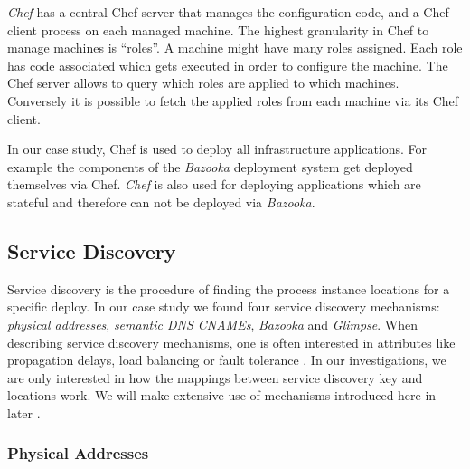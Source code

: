 \emph{Chef} has a central Chef server that manages the configuration code, and a Chef client process on each managed machine. The highest granularity in Chef to manage machines is ``roles''. A machine might have many roles assigned. Each role has code associated which gets executed in order to configure the machine. The Chef server allows to query which roles are applied to which machines. Conversely it is possible to fetch the applied roles from each machine via its Chef client.

In our case study, Chef is used to deploy all infrastructure applications. For example the components of the \emph{Bazooka} deployment system get deployed themselves via Chef. \emph{Chef} is also used for deploying applications which are stateful and therefore can not be deployed via \emph{Bazooka}.


%

\subsection{Service Discovery}
\label{subsec:servicediscovery}

Service discovery is the procedure of finding the process instance locations for a specific deploy. In our case study we found four service discovery mechanisms: \emph{physical addresses}, \emph{semantic DNS CNAMEs}, \emph{Bazooka} and \emph{Glimpse}. When describing service discovery mechanisms, one is often interested in attributes like propagation delays, load balancing or fault tolerance \cite{servicediscoverysurvey}. In our investigations, we are only interested in how the mappings between service discovery key and locations work. We will make extensive use of mechanisms introduced here in later .

\subsubsection{Physical Addresses}


